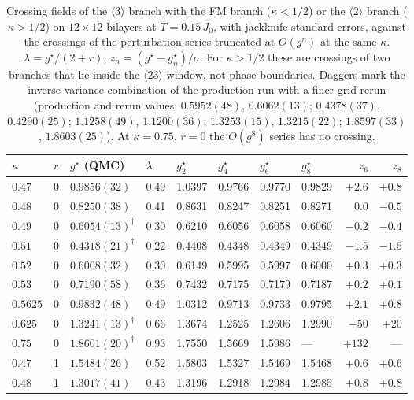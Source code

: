 \documentclass[
 aps,prb,
 twocolumn,
 superscriptaddress,
 longbibliography,
 nofootinbib,
 floatfix
]{revtex4-2}
\begin{document}
\begin{table}
\caption{Crossing fields of the $\langle3\rangle$ branch with the FM branch ($\kappa<1/2$) or the
$\langle2\rangle$ branch ($\kappa>1/2$) on $12\times12$ bilayers at $T=0.15\,J_0$, with jackknife
standard errors, against the crossings of the perturbation series truncated at $O(g^n)$ at the same
$\kappa$. $\lambda=g^\star/(2+r)$; $z_n=(g^\star-g^\star_n)/\sigma$. For $\kappa>1/2$ these are crossings of
two branches that lie inside the $\langle23\rangle$ window, not phase boundaries. Daggers mark the
inverse-variance combination of the production run with a finer-grid rerun (production and rerun values:
$0.5952(48)$, $0.6062(13)$; $0.4378(37)$, $0.4290(25)$; $1.1258(49)$, $1.1200(36)$; $1.3253(15)$, $1.3215(22)$; $1.8597(33)$,
$1.8603(25)$). At $\kappa=0.75$, $r=0$
the $O(g^8)$ series has no crossing.}
\label{tab:crossings}
\begin{ruledtabular}
\begin{tabular}{llllllllrr}
$\kappa$ & $r$ & $g^\star$ (QMC) & $\lambda$ & $g^\star_2$ & $g^\star_4$ & $g^\star_6$ & $g^\star_8$ & $z_6$ & $z_8$ \\
\hline
$0.47$ & 0 & $0.9856(32)$ & 0.49 & 1.0397 & 0.9766 & 0.9770 & 0.9829 & $+2.6$ & $+0.8$ \\
$0.48$ & 0 & $0.8250(38)$ & 0.41 & 0.8631 & 0.8247 & 0.8251 & 0.8271 & $0.0$ & $-0.5$ \\
$0.49$ & 0 & $0.6054(13)^\dagger$ & 0.30 & 0.6210 & 0.6056 & 0.6058 & 0.6060 & $-0.2$ & $-0.4$ \\
$0.51$ & 0 & $0.4318(21)^\dagger$ & 0.22 & 0.4408 & 0.4348 & 0.4349 & 0.4349 & $-1.5$ & $-1.5$ \\
$0.52$ & 0 & $0.6008(32)$ & 0.30 & 0.6149 & 0.5995 & 0.5997 & 0.6000 & $+0.3$ & $+0.3$ \\
$0.53$ & 0 & $0.7190(58)$ & 0.36 & 0.7432 & 0.7175 & 0.7179 & 0.7187 & $+0.2$ & $+0.1$ \\
$0.5625$ & 0 & $0.9832(48)$ & 0.49 & 1.0312 & 0.9713 & 0.9733 & 0.9795 & $+2.1$ & $+0.8$ \\
$0.625$ & 0 & $1.3241(13)^\dagger$ & 0.66 & 1.3674 & 1.2525 & 1.2606 & 1.2990 & $+50$ & $+20$ \\
$0.75$ & 0 & $1.8601(20)^\dagger$ & 0.93 & 1.7550 & 1.5669 & 1.5986 & --- & $+132$ & --- \\
$0.47$ & 1 & $1.5484(26)$ & 0.52 & 1.5803 & 1.5327 & 1.5469 & 1.5468 & $+0.6$ & $+0.6$ \\
$0.48$ & 1 & $1.3017(41)$ & 0.43 & 1.3196 & 1.2918 & 1.2984 & 1.2985 & $+0.8$ & $+0.8$ \\

\end{tabular}
\end{ruledtabular}
\end{table}
\end{document}
